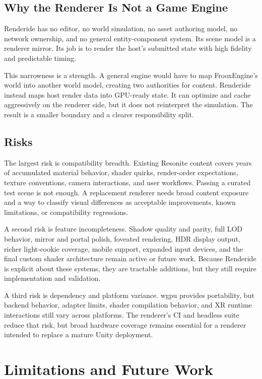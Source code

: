 \documentclass[acmtog,screen,nonacm]{acmart}
\begin{document}
\subsection{Why the Renderer Is Not a Game Engine}

Renderide has no editor, no world simulation, no asset authoring model, no network ownership, and no general entity-component system. Its scene model is a renderer mirror. Its job is to render the host's submitted state with high fidelity and predictable timing.

This narrowness is a strength. A general engine would have to map FrooxEngine's world into another world model, creating two authorities for content. Renderide instead maps host render data into GPU-ready state. It can optimize and cache aggressively on the renderer side, but it does not reinterpret the simulation. The result is a smaller boundary and a clearer responsibility split.

\subsection{Risks}

The largest risk is compatibility breadth. Existing Resonite content covers years of accumulated material behavior, shader quirks, render-order expectations, texture conventions, camera interactions, and user workflows. Passing a curated test scene is not enough. A replacement renderer needs broad content exposure and a way to classify visual differences as acceptable improvements, known limitations, or compatibility regressions.

A second risk is feature incompleteness. Shadow quality and parity, full LOD behavior, mirror and portal polish, foveated rendering, HDR display output, richer light-cookie coverage, mobile support, expanded input devices, and the final custom shader architecture remain active or future work. Because Renderide is explicit about these systems, they are tractable additions, but they still require implementation and validation.

A third risk is dependency and platform variance. wgpu provides portability, but backend behavior, adapter limits, shader compilation behavior, and XR runtime interactions still vary across platforms. The renderer's CI and headless suite reduce that risk, but broad hardware coverage remains essential for a renderer intended to replace a mature Unity deployment.

\section{Limitations and Future Work}
\end{document}
